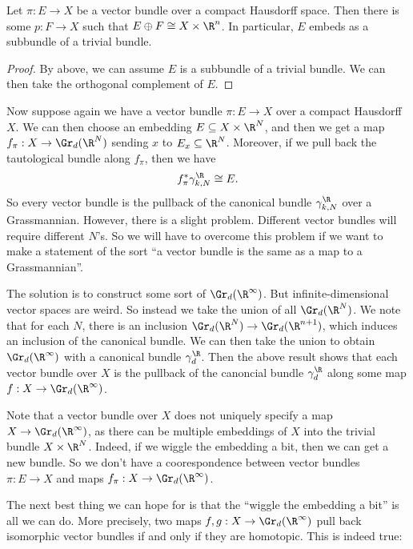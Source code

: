 \documentclass[a4paper]{article}
\theoremstyle{definition}
\begin{document}
\begin{cor}
  Let $\pi: E \to X$ be a vector bundle over a compact Hausdorff space. Then there is some $p: F \to X$ such that $E \oplus F \cong X \times \R^n$. In particular, $E$ embeds as a subbundle of a trivial bundle.
\end{cor}

\begin{proof}
  By above, we can assume $E$ is a subbundle of a trivial bundle. We can then take the orthogonal complement of $E$.
\end{proof}

Now suppose again we have a vector bundle $\pi: E\to X$ over a compact Hausdorff $X$. We can then choose an embedding $E \subseteq X \times \R^N$, and then we get a map $f_\pi: X \to \Gr_d (\R^N)$ sending $x$ to $E_x \subseteq \R^N$. Moreover, if we pull back the tautological bundle along $f_\pi$, then we have
\[
  f_{\pi}^* \gamma_{k, N}^\R \cong E.
\]
So every vector bundle is the pullback of the canonical bundle $\gamma_{k, N}^\R$ over a Grassmannian. However, there is a slight problem. Different vector bundles will require different $N$'s. So we will have to overcome this problem if we want to make a statement of the sort ``a vector bundle is the same as a map to a Grassmannian''.

The solution is to construct some sort of $\Gr_d(\R^\infty)$. But infinite-dimensional vector spaces are weird. So instead we take the union of all $\Gr_d(\R^N)$. We note that for each $N$, there is an inclusion $\Gr_d(\R^N) \to \Gr_d(\R^{n + 1})$, which induces an inclusion of the canonical bundle. We can then take the union to obtain $\Gr_d(\R^\infty)$ with a canonical bundle $\gamma_d^\R$. Then the above result shows that each vector bundle over $X$ is the pullback of the canoncial bundle $\gamma_d^\R$ along some map $f: X \to \Gr_d(\R^\infty)$.

Note that a vector bundle over $X$ does not uniquely specify a map $X \to \Gr_d(\R^\infty)$, as there can be multiple embeddings of $X$ into the trivial bundle $X \times \R^N$. Indeed, if we wiggle the embedding a bit, then we can get a new bundle. So we don't have a coorespondence between vector bundles $\pi: E \to X$ and maps $f_\pi: X \to \Gr_d(\R^\infty)$.

The next best thing we can hope for is that the ``wiggle the embedding a bit'' is all we can do. More precisely, two maps $f, g: X \to \Gr_d(\R^\infty)$ pull back isomorphic vector bundles if and only if they are homotopic. This is indeed true:
\end{document}
